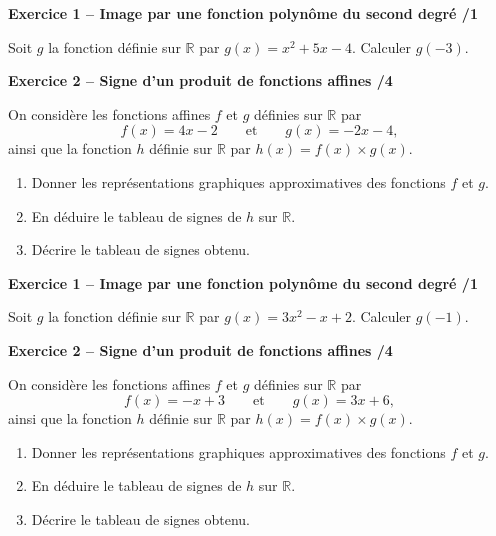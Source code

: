 \documentclass[10pt,a4paper]{article}
\begin{document}
\begin{sujets}


\textbf{Exercice 1 -- Image par une fonction polynôme du second degré \hfill /1}

Soit \(g\) la fonction définie sur \(\mathbb{R}\) par \(g(x)=x^2+5x-4\). Calculer \(g(-3)\).

\vspace{2cm}

\textbf{Exercice 2 -- Signe d'un produit de fonctions affines \hfill /4}

On considère les fonctions affines \(f\) et \(g\) définies sur \(\mathbb{R}\) par
\[
f(x)=4x-2 \qquad\text{et}\qquad g(x)=-2x-4,
\]
ainsi que la fonction \(h\) définie sur \(\mathbb{R}\) par \(h(x)=f(x)\times g(x)\).

\begin{enumerate}
\item Donner les représentations graphiques approximatives des fonctions \(f\) et \(g\).

\vspace{2cm}

\item En déduire le tableau de signes de \(h\) sur \(\mathbb{R}\).

\vspace{4cm}

\item Décrire le tableau de signes obtenu.
\end{enumerate}

\columnbreak


\textbf{Exercice 1 -- Image par une fonction polynôme du second degré \hfill /1}

Soit \(g\) la fonction définie sur \(\mathbb{R}\) par \(g(x)=3x^2-x+2\). Calculer \(g(-1)\).

\vspace{2cm}

\textbf{Exercice 2 -- Signe d'un produit de fonctions affines \hfill /4}

On considère les fonctions affines \(f\) et \(g\) définies sur \(\mathbb{R}\) par
\[
f(x)=-x+3 \qquad\text{et}\qquad g(x)=3x+6,
\]
ainsi que la fonction \(h\) définie sur \(\mathbb{R}\) par \(h(x)=f(x)\times g(x)\).

\begin{enumerate}
\item Donner les représentations graphiques approximatives des fonctions \(f\) et \(g\).

\vspace{2cm}

\item En déduire le tableau de signes de \(h\) sur \(\mathbb{R}\).

\vspace{4cm}

\item Décrire le tableau de signes obtenu.
\end{enumerate}

\end{sujets}
\end{document}
